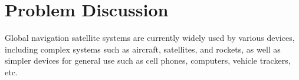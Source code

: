 %
%
%
%
%

%
%
%
%
%

\chapter{Problem Discussion} \label{ch:problem-discussion}






Global navigation satellite systems are currently widely used by various devices, including complex systems such as aircraft, satellites, and rockets, as well as simpler devices for general use such as cell phones, computers, vehicle trackers, etc.


